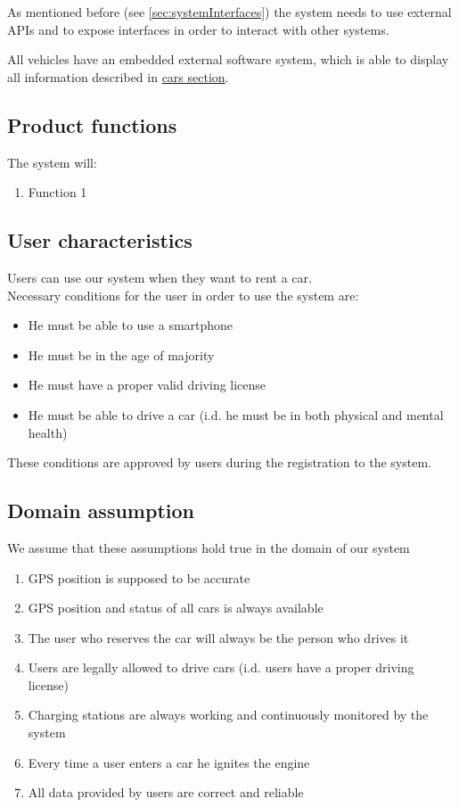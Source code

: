 As mentioned before (see \autoref{sec:systemInterfaces}) the system needs to use external APIs and to expose interfaces in order to interact with other systems.

All vehicles have an embedded external software system, which is able to display all information described in \hyperref[sec:cars]{cars section}.

\subsection{Product functions}
	The system will:
	\begin{enumerate}[label=\textbf{F\arabic*.}]
		\item Function 1
	\end{enumerate}

\subsection{User characteristics}
	Users can use our system when they want to rent a car.\\
	Necessary conditions for the user in order to use the system are:
	\begin{itemize}
		\item He must be able to use a smartphone
		\item He must be in the age of majority
		\item He must have a proper valid driving license
		\item He must be able to drive a car (i.d. he must be in both physical and mental health)
	\end{itemize}
	These conditions are approved by users during the registration to the system.

\subsection{Domain assumption}
	We assume that these assumptions hold true in the domain of our system 
	\begin{enumerate}[label=\textbf{DA\arabic*}]
		\item GPS position is supposed to be accurate
		\item GPS position and status of all cars is always available
		\item The user who reserves the car will always be the person who drives it
		\item Users are legally allowed to drive cars (i.d. users have a proper driving license)
		\item Charging stations are always working and continuously monitored by the system
		\item {}Every time a user enters a car he ignites the engine
		\item All data provided by users are correct and reliable
	\end{enumerate}
